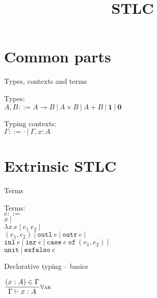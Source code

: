 \documentclass{beamer}
\title{STLC}
\newcommand{\pipe}{\ |\ }
\newcommand{\Fun}[2]{#1 \to #2}
\newcommand{\Prod}[2]{#1 \times #2}
\newcommand{\Sum}[2]{#1 + #2}
\newcommand{\Unit}{\textbf{1}}
\newcommand{\Empty}{\textbf{0}}
\newcommand{\fun}[2]{\lambda #1. #2}
\newcommand{\app}[2]{#1\ #2}
\newcommand{\pair}[2]{(#1, #2)}
\newcommand{\outl}[1][]{\texttt{outl}\ #1}
\newcommand{\outr}[1][]{\texttt{outr}\ #1}
\newcommand{\inl}[1][]{\texttt{inl}\ #1}
\newcommand{\inr}[1][]{\texttt{inr}\ #1}
\newcommand{\case}[3]{\texttt{case}\ #1\ \texttt{of}\ (#2, #3)}
\newcommand{\unit}{\texttt{unit}}
\newcommand{\exfalso}[1][]{\texttt{exfalso}\ #1}
\newcommand{\fulltyping}[3]{#1 \vdash #2 : #3}
\newcommand{\typing}[2]{\fulltyping{\Gamma}{#1}{#2}}
\newcommand{\infrule}[3][]{\displaystyle \frac{#2}{#3} \textsc{\footnotesize{#1}}}
\newcommand{\emptytypingctx}{\cdot}
\newcommand{\extend}[3]{#1, #2 : #3}
\newcommand{\sidecond}[1]{#1}
\begin{document}
\section{Common parts}

\begin{frame}{Types, contexts and terms}

Types: \\
$A, B ::= \Fun{A}{B} \pipe \Prod{A}{B} \pipe \Sum{A}{B} \pipe \Unit \pipe \Empty$

\vspace{2em}

Typing contexts: \\
$\Gamma ::= \emptytypingctx \pipe \extend{\Gamma}{x}{A}$

\end{frame}

\section{Extrinsic STLC}

\begin{frame}{Terms}

Terms: \\
$e ::=$ \\
\qquad $x \pipe$ \\
\qquad $\fun{x}{e} \pipe \app{e_1}{e_2} \pipe$ \\
\qquad $\pair{e_1}{e_2} \pipe \outl[e] \pipe \outr[e] \pipe$ \\
\qquad $\inl[e] \pipe \inr[e] \pipe \case{e}{e_1}{e_2} \pipe$ \\
\qquad $\unit \pipe \exfalso{e}$

\end{frame}

\begin{frame}{Declarative typing -- basics}

\begin{center}
  $\infrule[Var]{\sidecond{(x : A) \in \Gamma}}{\typing{x}{A}}$
\end{center}

\end{frame}
\end{document}
